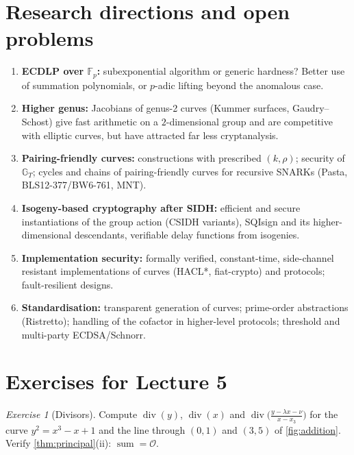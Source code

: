 \documentclass[11pt,a4paper,oneside]{book}
\theoremstyle{plain}
\theoremstyle{definition}
\theoremstyle{remark}
\newtheorem{exercise}{Exercise}[chapter]
\newcommand{\Fp}{\mathbb{F}_p}
\newcommand{\Oinf}{\mathcal{O}}
\newcommand{\divv}{\operatorname{div}}
\begin{document}
\section{Research directions and open problems}

\begin{enumerate}[nosep]
\item \textbf{ECDLP over $\Fp$:} subexponential algorithm or generic hardness? Better use of summation polynomials, or $p$-adic lifting beyond the anomalous case.
\item \textbf{Higher genus:} Jacobians of genus-2 curves (Kummer surfaces, Gaudry--Schost) give fast arithmetic on a $2$-dimensional group and are competitive with elliptic curves, but have attracted far less cryptanalysis.
\item \textbf{Pairing-friendly curves:} constructions with prescribed $(k,\rho)$; security of $\mathbb G_T$; cycles and chains of pairing-friendly curves for recursive SNARKs (Pasta, BLS12-377/BW6-761, MNT).
\item \textbf{Isogeny-based cryptography after SIDH:} efficient and secure instantiations of the group action (CSIDH variants), SQIsign and its higher-dimensional descendants, verifiable delay functions from isogenies.
\item \textbf{Implementation security:} formally verified, constant-time, side-channel resistant implementations of curves (HACL*, fiat-crypto) and protocols; fault-resilient designs.
\item \textbf{Standardisation:} transparent generation of curves; prime-order abstractions (Ristretto); handling of the cofactor in higher-level protocols; threshold and multi-party ECDSA/Schnorr.
\end{enumerate}

\section*{Exercises for Lecture 5}

\begin{exercise}[Divisors]
Compute $\divv(y)$, $\divv(x)$ and $\divv\big(\tfrac{y-\lambda x-\nu}{x-x_3}\big)$ for the curve $y^2=x^3-x+1$ and the line through $(0,1)$ and $(3,5)$ of \cref{fig:addition}. Verify \cref{thm:principal}(ii): $\operatorname{sum}=\Oinf$.
\end{exercise}
\end{document}
